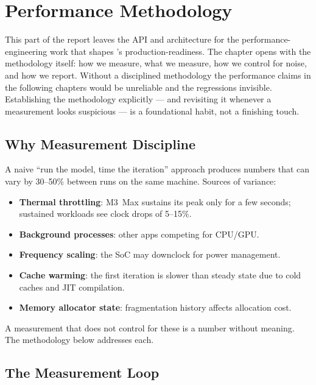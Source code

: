 \chapter{Performance Methodology}
\label{ch:perf_methodology}

This part of the report leaves the API and architecture for the
performance-engineering work that shapes \Lucid's
production-readiness. The chapter opens with the methodology
itself: how we measure, what we measure, how we control for
noise, and how we report. Without a disciplined methodology the
performance claims in the following chapters would be unreliable
and the regressions invisible. Establishing the methodology
explicitly --- and revisiting it whenever a measurement looks
suspicious --- is a foundational habit, not a finishing touch.

\section{Why Measurement Discipline}
\label{sec:perf_methodology:why_discipline}

A naive ``run the model, time the iteration'' approach produces
numbers that can vary by 30--50\% between runs on the same
machine. Sources of variance:

\begin{itemize}
  \item \textbf{Thermal throttling}: M3~Max sustains its peak
    only for a few seconds; sustained workloads see clock
    drops of 5--15\%.
  \item \textbf{Background processes}: other apps competing for
    CPU/GPU.
  \item \textbf{Frequency scaling}: the SoC may downclock for
    power management.
  \item \textbf{Cache warming}: the first iteration is slower
    than steady state due to cold caches and JIT compilation.
  \item \textbf{Memory allocator state}: fragmentation history
    affects allocation cost.
\end{itemize}

A measurement that does not control for these is a number
without meaning. The methodology below addresses each.

\section{The Measurement Loop}
\label{sec:perf_methodology:measurement_loop}

